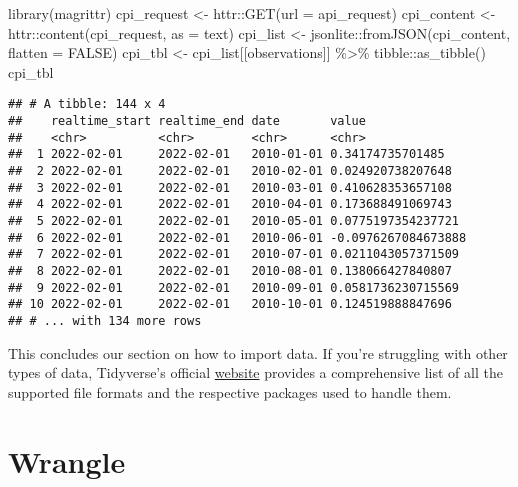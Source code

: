 \documentclass[
]{book}
\newenvironment{Shaded}{\begin{snugshade}}{\end{snugshade}}
\newcommand{\AttributeTok}[1]{\textcolor[rgb]{0.77,0.63,0.00}{#1}}
\newcommand{\ConstantTok}[1]{\textcolor[rgb]{0.00,0.00,0.00}{#1}}
\newcommand{\FunctionTok}[1]{\textcolor[rgb]{0.00,0.00,0.00}{#1}}
\newcommand{\NormalTok}[1]{#1}
\newcommand{\OtherTok}[1]{\textcolor[rgb]{0.56,0.35,0.01}{#1}}
\newcommand{\SpecialCharTok}[1]{\textcolor[rgb]{0.00,0.00,0.00}{#1}}
\newcommand{\StringTok}[1]{\textcolor[rgb]{0.31,0.60,0.02}{#1}}
\begin{document}
\begin{Shaded}
\begin{Highlighting}[]
\FunctionTok{library}\NormalTok{(magrittr)}
\NormalTok{cpi\_request }\OtherTok{\textless{}{-}}\NormalTok{ httr}\SpecialCharTok{::}\FunctionTok{GET}\NormalTok{(}\AttributeTok{url =}\NormalTok{ api\_request)}
\NormalTok{cpi\_content }\OtherTok{\textless{}{-}}\NormalTok{ httr}\SpecialCharTok{::}\FunctionTok{content}\NormalTok{(cpi\_request, }\AttributeTok{as =} \StringTok{\textquotesingle{}text\textquotesingle{}}\NormalTok{)}
\NormalTok{cpi\_list    }\OtherTok{\textless{}{-}}\NormalTok{ jsonlite}\SpecialCharTok{::}\FunctionTok{fromJSON}\NormalTok{(cpi\_content, }\AttributeTok{flatten =} \ConstantTok{FALSE}\NormalTok{)}
\NormalTok{cpi\_tbl     }\OtherTok{\textless{}{-}}\NormalTok{ cpi\_list[[}\StringTok{\textquotesingle{}observations\textquotesingle{}}\NormalTok{]] }\SpecialCharTok{\%\textgreater{}\%}\NormalTok{ tibble}\SpecialCharTok{::}\FunctionTok{as\_tibble}\NormalTok{()}
\NormalTok{cpi\_tbl}
\end{Highlighting}
\end{Shaded}

\begin{verbatim}
## # A tibble: 144 x 4
##    realtime_start realtime_end date       value              
##    <chr>          <chr>        <chr>      <chr>              
##  1 2022-02-01     2022-02-01   2010-01-01 0.34174735701485   
##  2 2022-02-01     2022-02-01   2010-02-01 0.024920738207648  
##  3 2022-02-01     2022-02-01   2010-03-01 0.410628353657108  
##  4 2022-02-01     2022-02-01   2010-04-01 0.173688491069743  
##  5 2022-02-01     2022-02-01   2010-05-01 0.0775197354237721 
##  6 2022-02-01     2022-02-01   2010-06-01 -0.0976267084673888
##  7 2022-02-01     2022-02-01   2010-07-01 0.0211043057371509 
##  8 2022-02-01     2022-02-01   2010-08-01 0.138066427840807  
##  9 2022-02-01     2022-02-01   2010-09-01 0.0581736230715569 
## 10 2022-02-01     2022-02-01   2010-10-01 0.124519888847696  
## # ... with 134 more rows
\end{verbatim}

This concludes our section on how to import data. If you're struggling with other types of data, Tidyverse's official \href{https://www.tidyverse.org/packages/\#import}{website} provides a comprehensive list of all the supported file formats and the respective packages used to handle them.

\hypertarget{wrangle}{%
\section{Wrangle}\label{wrangle}}
\end{document}
